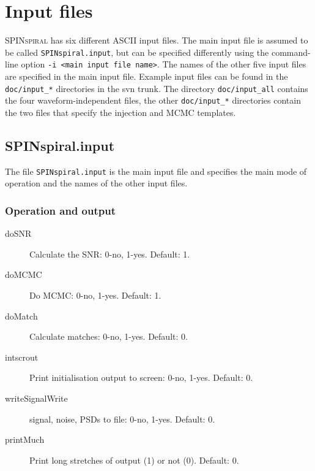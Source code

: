 \documentclass[10pt]{article}
\begin{document}
  















\pagebreak
\section{Input files}
\label{sec:input_files}

\textsc{SPINspiral} has six different ASCII input files.  The main input file is assumed to be called
\texttt{SPINspiral.input}, but can be specified differently using the command-line option \texttt{-i 
  <main input file name>}.  The names of the other five input files are specified in the main
input file.  Example input files can be found in the \texttt{doc/input\_*} directories in the svn
trunk.  The directory \texttt{doc/input\_all} contains the four waveform-independent files, the
other \texttt{doc/input\_*} directories contain the two files that specify the injection and MCMC
templates.


\subsection{SPINspiral.input}
\label{sec:SPINspiral.input}

The file \texttt{SPINspiral.input} is the main input file and specifies the main mode of operation 
and the names of the other input files.

\subsubsection{Operation and output}
\begin{description}
\item[doSNR] Calculate the SNR: 0-no, 1-yes. Default: 1.
\item[doMCMC] Do MCMC: 0-no, 1-yes.  Default: 1.
\item[doMatch] Calculate matches: 0-no, 1-yes.  Default: 0.
\item[intscrout]  Print initialisation output to screen: 0-no, 1-yes.  Default: 0.
\item[writeSignalWrite] signal, noise, PSDs to file: 0-no, 1-yes.  Default: 0.
\item[printMuch]  Print long stretches of output (1) or not (0).  Default: 0.
\end{description}
\end{document}
